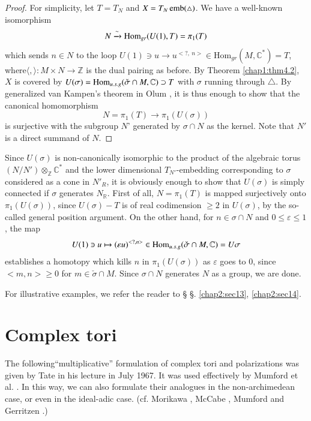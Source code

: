 \begin{proof}
For  simplicity, let $T=T_N$ and $X = T_N \operatorname{emb} (\triangle)$. We have a
well-known isomorphism 
$$
N \xrightarrow{\sim} \operatorname{Hom}_{gr} (U(1), T) = \pi_1 (T)  
$$
which sends $n \in N$ to the loop $U (1) \ni u \to u^{<?, ~ n>} \in
\text {Hom}_{gr} (M, \mathbb{C}^*)=T$, where\pageoriginale $\langle ,
\rangle : M 
\times N \to 
\mathbb{Z}$ is the dual pairing as before. By Theorem \ref{chap1:thm4.2}, $X$ is
covered by $U(\sigma) = \operatorname{Hom}_{u.s.g}(\check{\sigma} \cap M,
\mathbb{C}) \supset T$ with $\sigma$ running through $\triangle$. By
generalized van Kampen's theorem in Olum \cite{keyO1}, it is thus enough to
show that the canonical homomorphism 
$$
N = \pi_1 (T) \to \pi_1 (U(\sigma)) 
$$
is surjective with the subgroup $N$' generated by $\sigma \cap N$ as
the kernel. Note that $N'$ is a direct summand of $N$. 
\end{proof}

Since $U(\sigma)$ is non-canonically isomorphic to the product of the
algebraic torus $(N/N') \otimes_{\mathbb{Z}} \mathbb{C}^*$ and the
lower dimensional $T_{N'}$-embedding corresponding to $\sigma$
considered as a cone in $N'_R$, it is obviously enough to show that
$U(\sigma)$ is simply connected if $\sigma$ generates
$N_{\mathbb{R}}$. First of all, $N = \pi_1 (T)$ is mapped surjectively
onto $\pi_1 (U(\sigma))$, since $U(\sigma)-T$ is of real codimension
$\geq 2$ in $U(\sigma)$, by the so-called general position
argument. On the other hand, for $n \in \sigma \cap N$ and $0 \le
\varepsilon \le 1$, the map 
$$
U(1) \ni  u \mapsto (\varepsilon u)^{<?, n>} \in
\operatorname{Hom}_{u.s.g}(\check{\sigma} \cap M, \mathbb{C}) = U{\sigma}  
$$
establishes a homotopy which kills $n$ in $\pi_1 (U(\sigma))$ as
$\varepsilon$ goes to 0, since $<m, n> \geq 0$ for $m \in
\check{\sigma}\cap M$. Since $\sigma \cap N$ generates $N$ as a group,
we are done.  

For illustrative examples, we refer the reader to \S
\S. \ref{chap2:sec13}, \ref{chap2:sec14}.  


\section{Complex tori}\label{chap2:sec11} 
The following\pageoriginale ``multiplicative'' formulation of complex
tori and polarizations was given by Tate in his lecture in July
1967. It was used effectively by Mumford et al. \cite{keySC}. In this way,
we can also formulate their analogues in the non-archimedean case, or
even in the ideal-adic case. (cf. Morikawa \cite{keyM5}, McCabe \cite{keyM2},
Mumford \cite{keyM7} and Gerritzen \cite{keyG1}.)  

